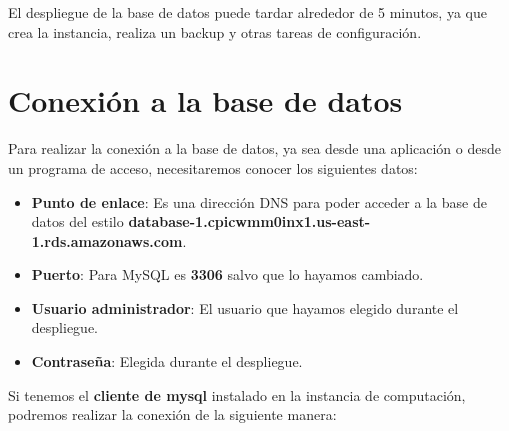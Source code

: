 El despliegue de la base de datos puede tardar alrededor de 5 minutos, ya que crea la instancia, realiza un backup y otras tareas de configuración.

\chapter{Conexión a la base de datos}

Para realizar la conexión a la base de datos, ya sea desde una aplicación o desde un programa de acceso, necesitaremos conocer los siguientes datos:

\begin{itemize}
	\item \textbf{Punto de enlace}: Es una dirección DNS para poder acceder a la base de datos del estilo \textbf{database-1.cpicwmm0inx1.us-east-1.rds.amazonaws.com}.
	\item \textbf{Puerto}: Para MySQL es \textbf{3306} salvo que lo hayamos cambiado.
	\item \textbf{Usuario administrador}: El usuario que hayamos elegido durante el despliegue.
	\item \textbf{Contraseña}: Elegida durante el despliegue.
\end{itemize}

Si tenemos el \textbf{cliente de mysql }instalado en la instancia de computación, podremos realizar la conexión de la siguiente manera:

